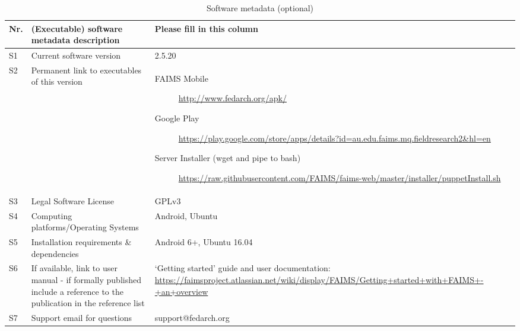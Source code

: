 \documentclass[preprint,12pt, a4paper]{elsarticle}
\begin{document}
\begin{table}[!h]
\begin{tabular}{|l|p{6.5cm}|p{6.5cm}|}
\hline
\textbf{Nr.} & \textbf{(Executable) software metadata description} & \textbf{Please fill in this column} \\
\hline
S1 & Current software version & 2.5.20 \\
\hline
S2 & Permanent link to executables of this version  & \begin{description} \item [FAIMS Mobile]\url{http://www.fedarch.org/apk/}
\item [Google Play] \url{https://play.google.com/store/apps/details?id=au.edu.faims.mq.fieldresearch2&hl=en}
\item [Server Installer (wget and pipe to bash)] \url{https://raw.githubusercontent.com/FAIMS/faims-web/master/installer/puppetInstall.sh} \end{description}\\

\hline
S3 & Legal Software License & GPLv3 \\
\hline
S4 & Computing platforms/Operating Systems & Android, Ubuntu \\
\hline
S5 & Installation requirements \& dependencies & Android 6+, Ubuntu 16.04 \\
\hline
S6 & If available, link to user manual - if formally published include a reference to the publication in the reference list & `Getting started' guide and user documentation:
\url{https://faimsproject.atlassian.net/wiki/display/FAIMS/Getting+started+with+FAIMS+-+an+overview} \\
\hline
S7 & Support email for questions & support@fedarch.org\\
\hline
\end{tabular}
\caption{Software metadata (optional)}

\end{table}
\end{document}
